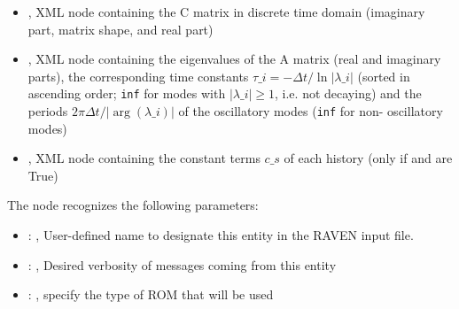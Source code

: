 \begin{itemize}
  real part)           \item {}, XML node containing the C matrix in discrete time
  domain                 (imaginary part, matrix shape, and real part)           \item
  , XML node containing the eigenvalues of the A matrix (real and imaginary
  parts), the corresponding time constants $\tau\_i = -\Delta t / \ln|\lambda\_i|$ (sorted in
  ascending order; \texttt{inf} for modes with $|\lambda\_i| \geq 1$, i.e. not decaying) and the
  periods $2 \pi \Delta t / |\arg(\lambda\_i)|$ of the oscillatory modes (\texttt{inf} for non-
  oscillatory                 modes)           \item {}, XML node containing
  the constant terms $c\_s$ of each history (only if                  and
   are True)         \end{itemize}

  The  node recognizes the following parameters:
    \begin{itemize}
      \item {}: ,
        User-defined name to designate this entity in the RAVEN input file.
      \item {}: ,
        Desired verbosity of messages coming from this entity
      \item {}: ,
        specify the type of ROM that will be used
  \end{itemize}

